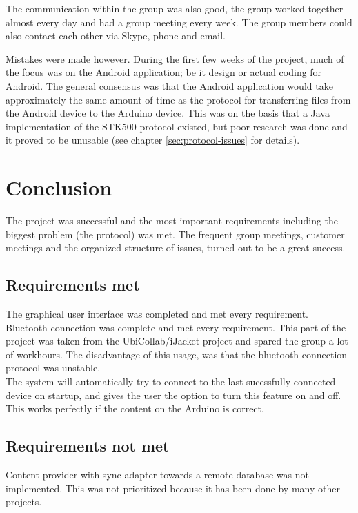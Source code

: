 	The communication within the group was also good, the group worked together almost every day and had a group meeting every week. The group members could also contact each other via Skype, phone and email.

	Mistakes were made however. During the first few weeks of the project, much of the focus was on the Android application; be it design or actual coding for Android. The general consensus was that the Android application would take approximately the same amount of time as the protocol for transferring files from the Android device to the Arduino device. This was on the basis that a Java implementation of the STK500 protocol existed, but poor research was done and it proved to be unusable (see chapter \ref{sec:protocol-issues} for details).


	\section{Conclusion}
    The project was successful and the most important requirements including the biggest problem (the protocol) was met. The frequent group meetings, customer meetings and the organized structure of issues, turned out to be a great success. \\

    	\subsection{Requirements met}
    		The graphical user interface was completed and met every requirement.\\

    		Bluetooth connection was complete and met every requirement. This part of the project was taken from the UbiCollab/iJacket project and spared the group a lot of workhours. The disadvantage of this usage, was that the bluetooth connection protocol was unstable.\\

    		The system will automatically try to connect to the last sucessfully connected device on startup, and gives the user the option to turn this feature on and off. This works perfectly if the content on the Arduino is correct.\\

		\subsection{Requirements not met}
			Content provider with sync adapter towards a remote database was not implemented. This was not prioritized because it has been done by many other projects. \\

